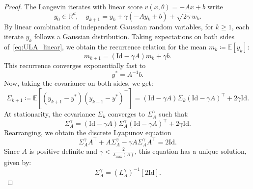 \documentclass[11pt]{article}
\newcommand{\eqdef}{\coloneqq}
\newcommand{\EE}{\mathbb{E}}
\begin{document}
\begin{proof}
The Langevin iterates with linear score $v(x, \theta) = -A x + b$ write
\begin{equation} \label{eq:ULA_linear}
    y_0 \in \mathbb{R}^d, \quad y_{k+1} = y_k + \gamma (-A y_k + b) + \sqrt{2 \gamma}\, w_k .
\end{equation}
By linear combination of independent Gaussian random variables, for \( k \geq 1 \), each iterate \( y_k \) follows a Gaussian distribution. Taking expectations on both sides of~\eqref{eq:ULA_linear}, we obtain the recurrence relation for the mean $m_k \eqdef  \mathbb{E}[y_k]$: 
\begin{equation*}
m_{k+1} = (\mathrm{Id} - \gamma A) m_k + \gamma b.
\end{equation*}
This recurrence converges exponentially fast to
\begin{equation*}
y^* = A^{-1} b.
\end{equation*}
Now, taking the covariance on both sides, we get:
\begin{equation*}
\Sigma_{k+1} \eqdef \EE[(y_{k+1} - y^*)(y_{k+1} - y^*)^\top]  = (\mathrm{Id} - \gamma A) \Sigma_k (\mathrm{Id} - \gamma A)^\top + 2\gamma \mathrm{Id}.
\end{equation*}
At stationarity, the covariance $\Sigma_{k}$ converges to $\Sigma^\gamma_A$ such that:
\begin{equation*}
\Sigma^\gamma_A = (\mathrm{Id} - \gamma A) \Sigma^\gamma_A (\mathrm{Id} - \gamma A)^\top + 2\gamma \mathrm{Id}.
\end{equation*}
Rearranging, we obtain the discrete Lyapunov equation
\begin{equation*}
\Sigma^\gamma_A A^\top + A \Sigma^\gamma_A - \gamma A \Sigma^\gamma_A A^\top  = 2 \mathrm{Id}.
\end{equation*}
Since \( A \) is positive definite and \( \gamma < \frac{2}{\lambda_{\max}(A)} \), this equation has a unique solution, given by:
\begin{equation*}
\Sigma^\gamma_A = (L^\gamma_A)^{-1}[2\mathrm{Id}].
\end{equation*}

\end{proof}
\end{document}
